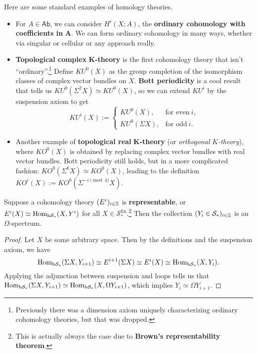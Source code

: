 \begin{example}
    Here are some standard examples of homology theories.
    \begin{itemize}
    \setlength\itemsep{-.2em}
\item For $A \in \mathsf{Ab} $, we can consider $H^i (X;A)$, the \textbf{ordinary cohomology with coefficients in} $\mathbf A$. We can form ordinary cohomology in many ways, whether via singular or cellular or any approach really.
\item \textbf{Topological complex} $\mathbf K$\textbf{-theory} is the first cohomology theory that isn't ``ordinary''.\footnote{Previously there was a dimension axiom uniquely characterizing ordinary cohomology theories, but that was dropped.} Define $KU^0(X)$ as the group completion of the isomorphism classes of complex vector bundles on $X$. \textbf{Bott periodicity} is a cool result that tells us $KU^0(\Sigma ^2 X) \simeq  KU^0 (X)$, so we can extend $KU^i $ by the suspension axiom to get \[
        KU ^i (X):=
        \begin{cases}
            KU^0(X), & \text{for even} \ i,\\
            KU^0(\Sigma X), & \text{for odd} \ i.
        \end{cases}
\] 
\item Another example of \textbf{topological real} $\mathbf K$\textbf{-theory} (or \emph{orthogonal} $K$\textit{-theory}), where $KO^0(X)$ is obtained by replacing complex vector bundles with real vector bundles. Bott periodicity still holds, but in a more complicated fashion: $KO^0(\Sigma^8 X) \simeq  KO^0(X)$, leading to the definition $KO ^i (X):= KO^0(\Sigma ^{-i \pmod 4}X)$.
    \end{itemize}
\end{example}

\begin{claim}
Suppose a cohomology theory $(E^i ) _{i \in \mathbb{Z}}$ is \textbf{representable}, or $E^i (X) \simeq \operatorname{Hom} _{\mathrm{h}\mathcal{S} _*}(X,Y^i )$ for all $X \in  \mathcal{S} _* ^{\mathrm{fin}}$.\footnote{This is actually always the case due to \textbf{Brown's representability theorem}.} Then the collection $(Y _i  \in \mathcal{S} _*) _{i \in \mathbb{Z}}$ is an $\Omega$-spectrum.
\end{claim}
\begin{proof}
    Let $X$ be some arbitrary space. Then by the definitions and the suspension axiom, we have \[
        \operatorname{Hom} _{\mathrm{h}\mathcal{S} _*}(\Sigma X, Y_{i+1}) \simeq  E^{i+1}(\Sigma X) \simeq  E^i (X) \simeq  \operatorname{Hom} _{\mathrm{h}\mathcal{S} _*}(X, Y_i ).
    \] Applying the adjunction between suspension and loops tells us that $\operatorname{Hom} _{\mathrm{h}\mathcal{S} _*}(\Sigma X, Y_{i+1}) \simeq \operatorname{Hom} _{\mathrm{h}\mathcal{S} _*}(X,\Omega Y_{i+1})$, which implies $Y_i  \simeq \Omega Y_{i+1}$.
\end{proof}

